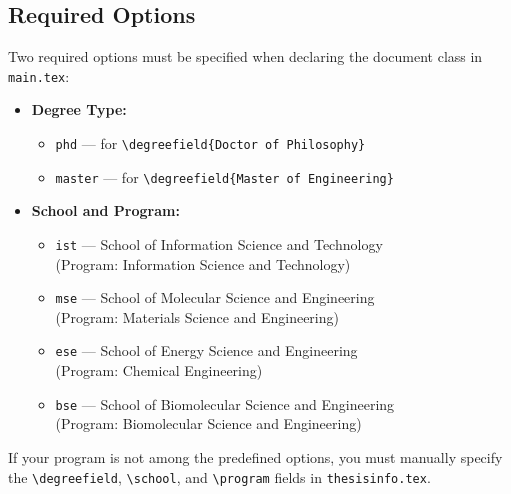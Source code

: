 \subsection{Required Options}
\begin{subparagraph}
Two required options must be specified when declaring the document class in \texttt{main.tex}:

\begin{itemize}[leftmargin=\subparitemindent]
    \item \textbf{Degree Type:}
    \begin{itemize}[leftmargin=1em]
        \item \texttt{phd} — for \verb|\degreefield{Doctor of Philosophy}|
        \item \texttt{master} — for \verb|\degreefield{Master of Engineering}|
    \end{itemize}

    \item \textbf{School and Program:}
    \begin{itemize}[leftmargin=1em]
        \item \texttt{ist} — School of Information Science and Technology \\ \quad\quad (Program: Information Science and Technology)
        \item \texttt{mse} — School of Molecular Science and Engineering \\ \quad\quad (Program: Materials Science and Engineering)
        \item \texttt{ese} — School of Energy Science and Engineering \\ \quad\quad (Program: Chemical Engineering)
        \item \texttt{bse} — School of Biomolecular Science and Engineering \\ \quad\quad (Program: Biomolecular Science and Engineering)
    \end{itemize}
\end{itemize}

If your program is not among the predefined options, you must manually specify the \verb|\degreefield|, \verb|\school|, and \verb|\program| fields in \texttt{thesisinfo.tex}.
\end{subparagraph}

